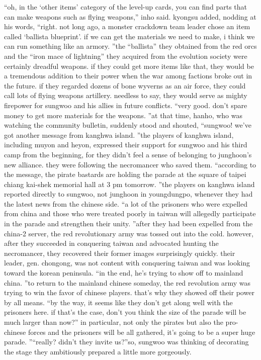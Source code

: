 “oh, in the ‘other items’ category of the level-up cards, you can find parts that can make weapons such as flying weapons,” inho said.
kyongsu added, nodding at his words, “right.
 not long ago, a monster crackdown team leader chose an item called ‘ballista blueprint’.
 if we can get the materials we need to make, i think we can run something like an armory.
”the “ballista” they obtained from the red orcs and the “iron mace of lightning” they acquired from the evolution society were certainly dreadful weapons.
 if they could get more items like that, they would be a tremendous addition to their power when the war among factions broke out in the future.
if they regarded dozens of bone wyverns as an air force, they could call lots of flying weapons artillery.
 needless to say, they would serve as mighty firepower for sungwoo and his allies in future conflicts.
“very good.
 don’t spare money to get more materials for the weapons.
”at that time, hanho, who was watching the community bulletin, suddenly stood and shouted, “sungwoo! we’ve got another message from kanghwa island.
”the players of kanghwa island, including muyon and heyon, expressed their support for sungwoo and his third camp from the beginning, for they didn’t feel a sense of belonging to junghoon’s new alliance.
 they were following the necromancer who saved them.
“according to the message, the pirate bastards are holding the parade at the square of taipei chiang kai-shek memorial hall at 3 pm tomorrow.
”the players on kanghwa island reported directly to sungwoo, not junghoon in youngdungpo, whenever they had the latest news from the chinese side.
“a lot of the prisoners who were expelled from china and those who were treated poorly in taiwan will allegedly participate in the parade and strengthen their unity.
”after they had been expelled from the china-2 server, the red revolutionary army was tossed out into the cold.
 however, after they succeeded in conquering taiwan and advocated hunting the necromancer, they recovered their former images surprisingly quickly.
 their leader, gen.
 chongong, was not content with conquering taiwan and was looking toward the korean peninsula.
“in the end, he’s trying to show off to mainland china.
”to return to the mainland chinese someday, the red revolution army was trying to win the favor of chinese players.
 that’s why they showed off their power by all means.
“by the way, it seems like they don’t get along well with the prisoners here.
 if that’s the case, don’t you think the size of the parade will be much larger than now?” in particular, not only the pirates but also the pro-chinese forces and the prisoners will be all gathered, it’s going to be a super huge parade.
”“really? didn’t they invite us?”so, sungwoo was thinking of decorating the stage they ambitiously prepared a little more gorgeously.

